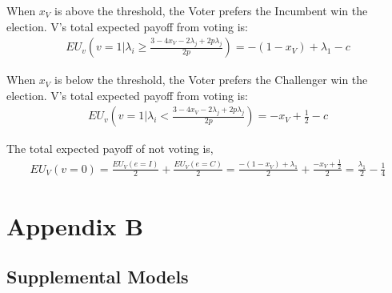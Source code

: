 \documentclass[12pt]{paper}
\begin{document}
When $x_V$ is above the threshold, the Voter prefers the Incumbent win the election. V's total expected payoff from voting is:
\begin{gather}
EU_v(v = 1 | \lambda_i \geq \frac{3 - 4x_V - 2\lambda_j + 2p\lambda_j}{2p}) = 
-(1 - x_V) + \lambda_1 - c
\end{gather}

When $x_V$ is below the threshold, the Voter prefers the Challenger win the election. V's total expected payoff from voting is:
\begin{gather}
EU_v(v = 1 | \lambda_i < \frac{3 - 4x_V - 2\lambda_j + 2p\lambda_j}{2p}) = 
-x_V + \frac{1}{2} - c
\end{gather}

The total expected payoff of not voting is,
\begin{gather}
EU_V (v=0) = \frac{EU_V (e=I)}{2} + \frac{EU_V (e=C)}{2} =
 \frac{- (1 - x_V ) + \lambda_1}{2} + \frac{-x_V + \frac{1}{2}}{2} = 
 \frac{\lambda_1}{2} - \frac{1}{4}
\end{gather}

\clearpage

\section*{Appendix B}
\subsection{Supplemental Models}
\end{document}
